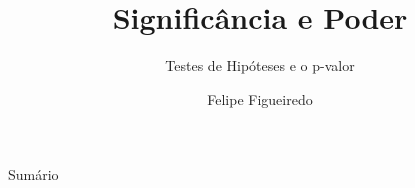\documentclass{beamer}
\title[Significância] %
{Significância e Poder}
\subtitle
 {Testes de Hipóteses e o p-valor} %
\author%
{Felipe Figueiredo}%
\institute[] %
{
}
\date%
{}
\begin{document}
\begin{frame}
  \titlepage
\end{frame}

\begin{frame}{Sumário}
  \tableofcontents
\end{frame}








\end{document}
